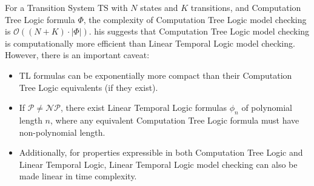 \noindent For a Transition System $\text{TS}$ with $N$ states and $K$ transitions, and Computation Tree Logic formula $\Phi$, the complexity of Computation Tree Logic model checking is $\mathcal{O}((N+K)\cdot\left\lvert \Phi\right\rvert )$.
his suggests that Computation Tree Logic model checking is computationally more efficient than Linear Temporal Logic model checking.
However, there is an important caveat:
\begin{itemize}
    \item TL formulas can be exponentially more compact than their Computation Tree Logic equivalents (if they exist).
    \item If $\mathcal{P}\neq\mathcal{NP}$, there exist Linear Temporal Logic formulas $\phi_n$ of polynomial length $n$, where any equivalent Computation Tree Logic formula must have non-polynomial length.
    \item Additionally, for properties expressible in both Computation Tree Logic and Linear Temporal Logic, Linear Temporal Logic model checking can also be made linear in time complexity.
\end{itemize}